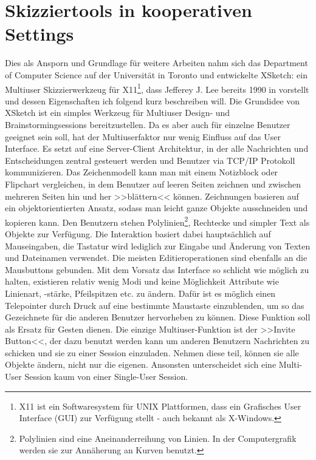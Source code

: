 \section{Skizziertools in kooperativen Settings}
Dies als Ansporn und Grundlage für weitere Arbeiten nahm sich das Department of Computer Science auf der Universität in Toronto und entwickelte XSketch: ein Multiuser Skizzierwerkzeug für X11\footnote{X11 ist ein Softwaresystem für UNIX Plattformen, dass ein Grafisches User Interface (GUI) zur Verfügung stellt - auch bekannt als X-Windows.}, dass Jefferey J. Lee bereits 1990 in \cite{Lee:1990:XMS:91478.91510} vorstellt und dessen Eigenschaften ich folgend kurz beschreiben will.
Die Grundidee von XSketch ist ein simples Werkzeug für Multiuser Design- und Brainstormingsessions bereitzustellen. Da es aber auch für einzelne Benutzer geeignet sein soll, hat der Multiuserfaktor nur wenig Einfluss auf das User Interface. Es setzt auf eine Server-Client Architektur, in der alle Nachrichten und Entscheidungen zentral gesteuert werden und Benutzer via TCP/IP Protokoll kommunizieren. Das Zeichenmodell kann man mit einem Notizblock oder Flipchart vergleichen, in dem Benutzer auf leeren Seiten zeichnen und zwischen mehreren Seiten hin und her >>blättern<< können. Zeichnungen basieren auf ein objektorientierten Ansatz, sodass man leicht ganze Objekte ausschneiden und kopieren kann. Den Benutzern stehen Polylinien\footnote{Polylinien sind eine Aneinanderreihung von Linien. In der Computergrafik werden sie zur Annäherung an Kurven benutzt.}, Rechtecke und simpler Text als Objekte zur Verfügung. Die Interaktion basiert dabei hauptsächlich auf Mauseingaben, die Tastatur wird lediglich zur Eingabe und Änderung von Texten und Dateinamen verwendet. Die meisten Editieroperationen sind ebenfalls an die Mausbuttons gebunden. 
Mit dem Vorsatz das Interface so schlicht wie möglich zu halten, existieren relativ wenig Modi und keine Möglichkeit Attribute wie Linienart, -stärke, Pfeilspitzen etc. zu ändern. Dafür ist es möglich einen Telepointer durch Druck auf eine bestimmte Maustaste einzublenden, um so das Gezeichnete für die anderen Benutzer hervorheben zu können. Diese Funktion soll als Ersatz für Gesten dienen.
Die einzige Multiuser-Funktion ist der >>Invite Button<<, der dazu benutzt werden kann um anderen Benutzern Nachrichten zu schicken und sie zu einer Session einzuladen. Nehmen diese teil, können sie alle Objekte ändern, nicht nur die eigenen. Ansonsten unterscheidet sich eine Multi-User Session kaum von einer Single-User Session.

